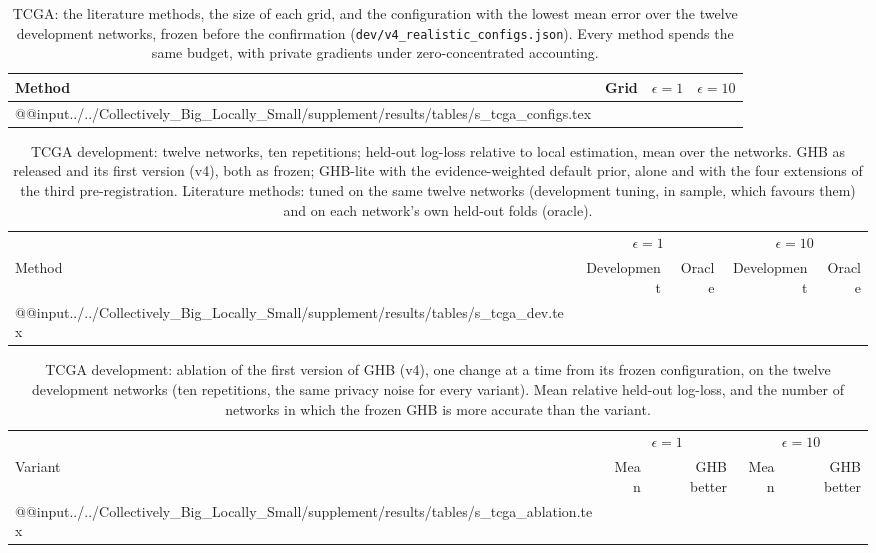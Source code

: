 \documentclass[acmsmall,screen,nonacm]{acmart}
\theoremstyle{acmdefinition}
\begin{document}
\begin{table}[t]
\caption{TCGA: the literature methods, the size of each grid, and the configuration with the lowest mean error over the twelve development networks, frozen before the confirmation (\texttt{dev/v4\_realistic\_configs.json}). Every method spends the same budget, with private gradients under zero-concentrated accounting.}
\label{tab:tcga-configs}
\scriptsize
\begin{tabularx}{\linewidth}{@{}lr>{\raggedright\arraybackslash}X>{\raggedright\arraybackslash}X@{}}
\toprule
Method & Grid & $\epsilon=1$ & $\epsilon=10$\\
\midrule
\csname @@input\endcsname../../Collectively_Big_Locally_Small/supplement/results/tables/s_tcga_configs.tex 
\bottomrule
\end{tabularx}
\end{table}

\begin{table}[t]
\caption{TCGA development: twelve networks, ten repetitions; held-out log-loss relative to local estimation, mean over the networks. GHB as released and its first version (v4), both as frozen; GHB-lite with the evidence-weighted default prior, alone and with the four extensions of the third pre-registration. Literature methods: tuned on the same twelve networks (development tuning, in sample, which favours them) and on each network's own held-out folds (oracle).}
\label{tab:tcga-dev}
\scriptsize
\begin{tabular}{@{}lrrrr@{}}
\toprule
 & \multicolumn{2}{c}{$\epsilon=1$} & \multicolumn{2}{c}{$\epsilon=10$}\\
\cmidrule(lr){2-3}\cmidrule(l){4-5}
Method & Development & Oracle & Development & Oracle\\
\midrule
\csname @@input\endcsname../../Collectively_Big_Locally_Small/supplement/results/tables/s_tcga_dev.tex 
\bottomrule
\end{tabular}
\end{table}

\begin{table}[t]
\caption{TCGA development: ablation of the first version of GHB (v4), one change at a time from its frozen configuration, on the twelve development networks (ten repetitions, the same privacy noise for every variant). Mean relative held-out log-loss, and the number of networks in which the frozen GHB is more accurate than the variant.}
\label{tab:tcga-ablation}
\scriptsize
\begin{tabular}{@{}lrrrr@{}}
\toprule
 & \multicolumn{2}{c}{$\epsilon=1$} & \multicolumn{2}{c}{$\epsilon=10$}\\
\cmidrule(lr){2-3}\cmidrule(l){4-5}
Variant & Mean & GHB better & Mean & GHB better\\
\midrule
\csname @@input\endcsname../../Collectively_Big_Locally_Small/supplement/results/tables/s_tcga_ablation.tex 
\bottomrule
\end{tabular}
\end{table}
\end{document}

